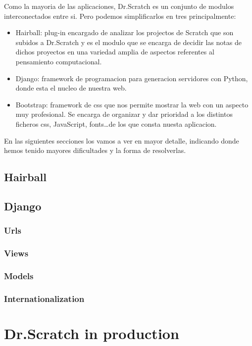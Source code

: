 \documentclass[a4paper, 12pt]{book}
\begin{document}
Como la mayoria de las aplicaciones, Dr.Scratch es un conjunto de modulos
interconectados entre si. Pero podemos simplificarlos en tres principalmente:
\begin{itemize}
\setlength{\parskip}{4mm}
	\item  Hairball: plug-in encargado de analizar los projectos de Scratch que son
	subidos a Dr.Scratch y es el modulo que se encarga de decidir las notas de
	dichos proyectos en una variedad amplia de aspectos referentes al pensamiento
	computacional.
	\item  Django: framework de programacion para generacion servidores con Python,
	donde esta el nucleo de nuestra web. 
	\item Bootstrap: framework de css que nos permite mostrar la web con un aspecto
	muy profesional. Se encarga de organizar y dar prioridad a los distintos
	ficheros css, JavaScript, fonts\ldots de los que consta nuesta aplicacion.
\end{itemize}

En las siguientes secciones los vamos a ver en mayor detalle, indicando donde
hemos tenido mayores dificultades y la forma de resolverlas.

\section{Hairball}

\section{Django}
\subsection{Urls}
\subsection{Views}
\subsection{Models}
\subsection{Internationalization}

\cleardoublepage
\chapter{Dr.Scratch in production}
\end{document}
